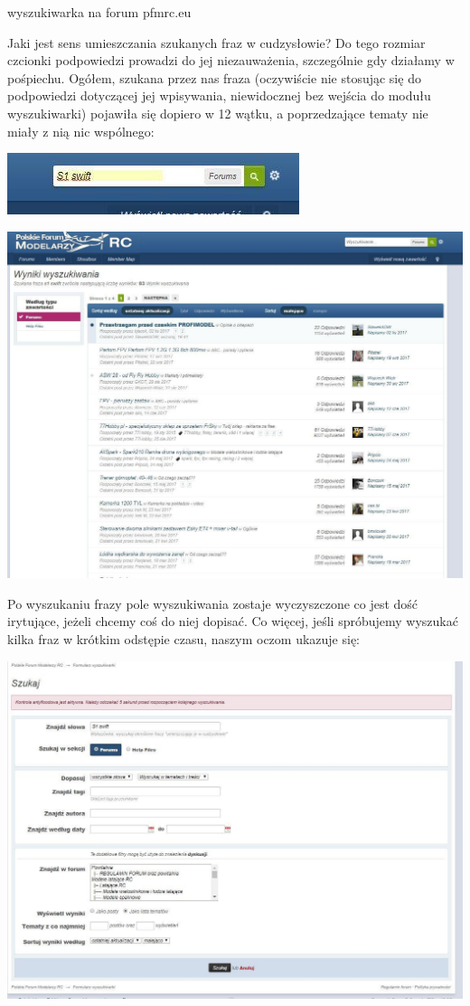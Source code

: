 \documentclass{article}
\begin{document}
\begin{enumerate}
\begin{center}
\caption{wyszukiwarka na forum pfmrc.eu}
\end{center}
Jaki jest sens umieszczania szukanych fraz w cudzysłowie?  Do tego rozmiar czcionki podpowiedzi prowadzi do jej niezauważenia, szczególnie gdy działamy w pośpiechu.
Ogółem, szukana przez nas fraza (oczywiście nie stosując się do podpowiedzi dotyczącej jej wpisywania, niewidocznej bez wejścia do modułu wyszukiwarki)  pojawiła się dopiero w 12 wątku, a poprzedzające tematy nie miały z nią nic wspólnego:
\begin{center}
\includegraphics[width=\textwidth]{2}
\end{center}
\begin{center}
\includegraphics[width=\textwidth]{3}
\end{center}
\newpage Po wyszukaniu frazy pole wyszukiwania zostaje wyczyszczone co jest dość irytujące, jeżeli chcemy coś do niej dopisać.
Co więcej, jeśli spróbujemy wyszukać kilka fraz w krótkim odstępie czasu, naszym oczom ukazuje się:
\begin{center}
\includegraphics[width=\textwidth]{4}

\end{center}
\end{enumerate}
\end{document}
